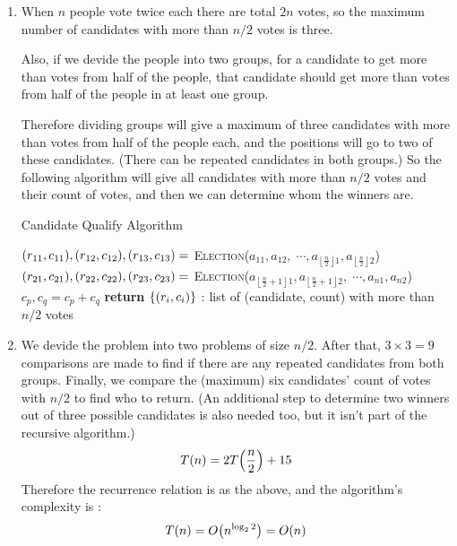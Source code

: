 \documentclass[10pt]{article}
\begin{document}
\begin{enumerate}[leftmargin=*]
    \item When $n$ people vote twice each there are total $2n$ votes, so the maximum number of candidates with more than $n/2$ votes is three.
    
    \vspace{1mm}
    Also, if we devide the people into two groups, for a candidate to get more than votes from half of the people, that candidate should get more than votes from half of the people in at least one group.

    \vspace{1mm}
    Therefore dividing groups will give a maximum of three candidates with more than votes from half of the people each, and the positions will go to two of these candidates. (There can be repeated candidates in both groups.) 
    So the following algorithm will give all candidates with more than $n/2$ votes and their count of votes, and then we can determine whom the winners are.
    
    \begin{algorithm}[H]
        \caption{Candidate Qualify Algorithm}\label{alg:cap}
        \begin{algorithmic}
            \State $\qty(r_{11}, c_{11}), \qty(r_{12}, c_{12}), \qty(r_{13}, c_{13}) =$ \textsc{Election}($a_{11}, a_{12}, \; \cdots , a_{\left\lfloor\frac{n}{2}\right\rfloor1}, a_{\left\lfloor\frac{n}{2}\right\rfloor2}$)
            \State $\qty(r_{21}, c_{21}), \qty(r_{22}, c_{22}), \qty(r_{23}, c_{23}) =$ \textsc{Election}($a_{\left\lfloor\frac{n}{2}+1\right\rfloor1}, a_{\left\lfloor\frac{n}{2}+1\right\rfloor2}, \; \cdots , a_{n1}, a_{n2}$)
                 
                    \State $c_p, c_q = c_p + c_q$ 
                \EndIf
            \EndFor
            \State \textbf{return} $\qty{\qty(r_i, c_i)}$ : list of (candidate, count) with more than $n/2$ votes 
            \EndFunction
        \end{algorithmic}
    \end{algorithm}

    \item We devide the problem into two problems of size $n/2$. 
    After that, $3 \times 3 = 9$ comparisons are made to find if there are any repeated candidates from both groups.
    Finally, we compare the (maximum) six candidates' count of votes with $n/2$ to find who to return.
    (An additional step to determine two winners out of three possible candidates is also needed too, but it isn't part of the recursive algorithm.)
    $$T(n) = 2T\qty(\frac{n}{2}) + 15$$
    Therefore the recurrence relation is as the above, and the algorithm's complexity is :
    $$T(n) = O\qty(n^{\log_{2}2}) = O(n)$$
\end{enumerate}
\end{document}
